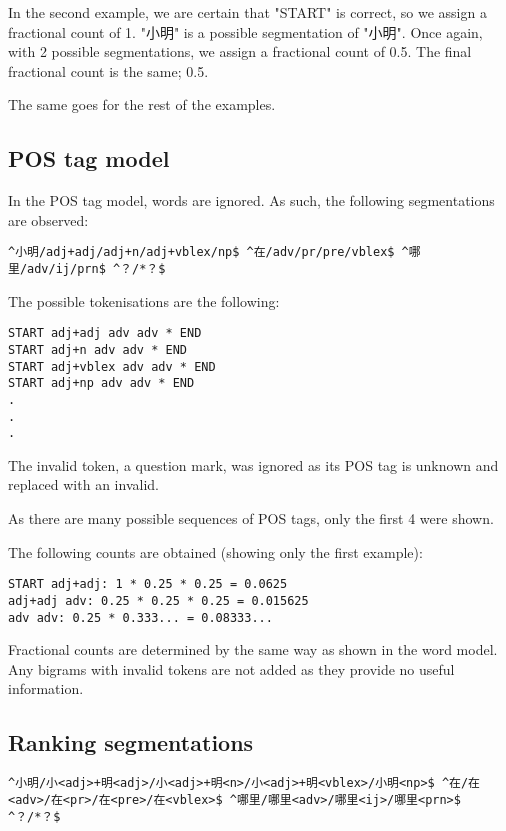\documentclass{article}
\begin{document}
In the second example, we are certain that "START" is correct, so we assign a fractional count of 1.
"小明" is a possible segmentation of "小明".
Once again, with 2 possible segmentations, we assign a fractional count of 0.5.
The final fractional count is the same; 0.5.

The same goes for the rest of the examples.

\subsection{POS tag model}

In the POS tag model, words are ignored. As such, the following segmentations are observed:

\begin{verbatim}
^小明/adj+adj/adj+n/adj+vblex/np$ ^在/adv/pr/pre/vblex$ ^哪里/adv/ij/prn$ ^？/*？$ 
\end{verbatim}

The possible tokenisations are the following:

\begin{verbatim}
START adj+adj adv adv * END
START adj+n adv adv * END
START adj+vblex adv adv * END
START adj+np adv adv * END
.
.
.
\end{verbatim}

The invalid token, a question mark, was ignored as its POS tag is unknown and replaced with an invalid.

As there are many possible sequences of POS tags, only the first 4 were shown.

The following counts are obtained (showing only the first example):

\begin{verbatim}
START adj+adj: 1 * 0.25 * 0.25 = 0.0625
adj+adj adv: 0.25 * 0.25 * 0.25 = 0.015625
adv adv: 0.25 * 0.333... = 0.08333...
\end{verbatim}

Fractional counts are determined by the same way as shown in the word model.
Any bigrams with invalid tokens are not added as they provide no useful information.

\subsection{Ranking segmentations}

\begin{verbatim}
^小明/小<adj>+明<adj>/小<adj>+明<n>/小<adj>+明<vblex>/小明<np>$ ^在/在<adv>/在<pr>/在<pre>/在<vblex>$ ^哪里/哪里<adv>/哪里<ij>/哪里<prn>$ ^？/*？$ 
\end{verbatim}
\end{document}

